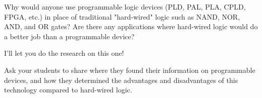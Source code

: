 

Why would anyone use programmable logic devices (PLD, PAL, PLA, CPLD, FPGA, etc.) in place of traditional "hard-wired" logic such as NAND, NOR, AND, and OR gates?  Are there any applications where hard-wired logic would do a better job than a programmable device?







I'll let you do the research on this one!







Ask your students to share where they found their information on programmable devices, and how they determined the advantages and disadvantages of this technology compared to hard-wired logic.




